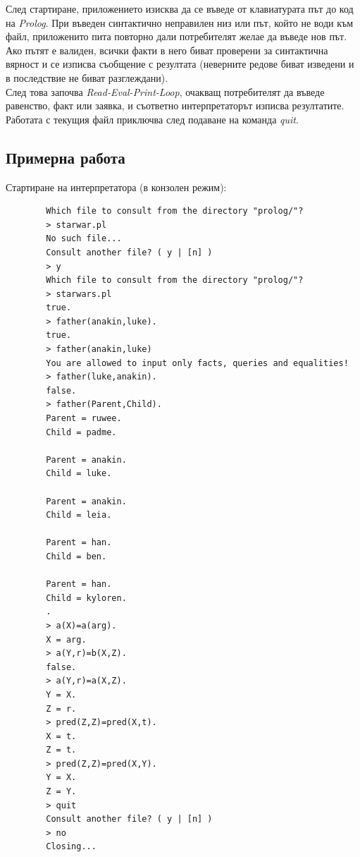 \documentclass[15pt]{extarticle}
\begin{document}
	След стартиране, приложението изисква да се въведе от клавиатурата път до код на \emph{Prolog}. При въведен синтактично неправилен низ или път, който не води към файл, приложенито пита повторно дали потребителят желае да въведе нов път. Ако пътят е валиден, всички факти в него биват проверени за синтактична вярност и се изписва съобщение с резултата (неверните редове биват изведени и в последствие не биват разглеждани).\\
	След това започва \emph{Read-Eval-Print-Loop}, очакващ потребителят да въведе равенство, факт или заявка, и съответно интерпретаторът изписва резултатите.\\
	Работата с текущия файл приключва след подаване на команда \emph{quit}.
	
	\subsection{Примерна работа}
	
	Стартиране на интерпретатора (в конзолен режим):
	
	\begin{lstlisting}
		Which file to consult from the directory "prolog/"?
		> starwar.pl
		No such file...
		Consult another file? ( y | [n] )
		> y
		Which file to consult from the directory "prolog/"?
		> starwars.pl
		true.
		> father(anakin,luke).
		true.
		> father(anakin,luke)
		You are allowed to input only facts, queries and equalities!
		> father(luke,anakin).
		false.
		> father(Parent,Child).
		Parent = ruwee.
		Child = padme.
		
		Parent = anakin.
		Child = luke.
		
		Parent = anakin.
		Child = leia.
		
		Parent = han.
		Child = ben.
		
		Parent = han.
		Child = kyloren.
		.
		> a(X)=a(arg).
		X = arg.
		> a(Y,r)=b(X,Z).
		false.
		> a(Y,r)=a(X,Z).
		Y = X.
		Z = r.
		> pred(Z,Z)=pred(X,t).
		X = t.
		Z = t.
		> pred(Z,Z)=pred(X,Y).
		Y = X.
		Z = Y.
		> quit
		Consult another file? ( y | [n] )
		> no
		Closing...
		
	\end{lstlisting}
	
	
\end{document}
